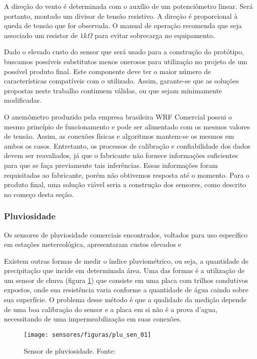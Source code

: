 			A direção do vento é determinada com o auxílio de um potenciômetro linear. Será portanto, montado um divisor de tensão resistivo. A direção é proporcional à queda de tensão que for observada. O manual de operação recomenda que seja associado um resistor de $1 k \Omega$ para evitar sobrecarga no equipamento.
			
			Dado o elevado custo do sensor que será usado para a construção do protótipo, buscamos possíveis substitutos menos onerosos para utilização no projeto de um possível produto final. Este componente deve ter o maior número de características compatíveis com o utilizado. Assim, garante-se que as soluções propostas neste trabalho continuem válidas, ou que sejam minimamente modificadas.
			
			O anemômetro produzido pela empresa brasileira WRF Comercial possui o mesmo princípio de funcionamento e pode ser alimentado com os mesmos valores de tensão. Assim, as conexões físicas e algoritmos mantem-se os mesmos em ambos os casos. Entretanto, os processos de calibração e confiabilidade dos dados devem ser reavaliados, já que o fabricante não fornece informações suficientes para que se faça previamente tais inferências. Essas informações foram requisitadas ao fabricante, porém não obtivemos resposta até o momento. Para o produto final, uma solução viável seria a construção dos sensores, como descrito no começo desta seção.

		\subsubsection{Pluviosidade}

			Os sensores de pluviosidade comerciais encontrados, voltados para uso específico em estações metereológica, apresentaram custos elevados e

			Existem outras formas de medir o índice pluviométrico, ou seja, a quantidade de precipitação que incide em determinada área. Uma das formas é a utilização de um sensor de chuva (figura \ref{plu_sen_01}) que consiste em uma placa com trilhos condutivos expostos, onde sua resistência varia conforme a quantidade de água caindo sobre sua superfície. O problema desse método é que a qualidade da medição depende de uma boa calibração do sensor e a placa em si não é a prova d'agua, necessitando de uma impermeabilização em suas conexões.
	
			\begin{figure}[H]
				\centering
				\texttt{[image: sensores/figuras/plu\_sen\_01]}
				\caption{Sensor de pluviosidade. Fonte: \cite{bib_plu_sen_01}}
				\label{plu_sen_01}
			\end{figure}
			
